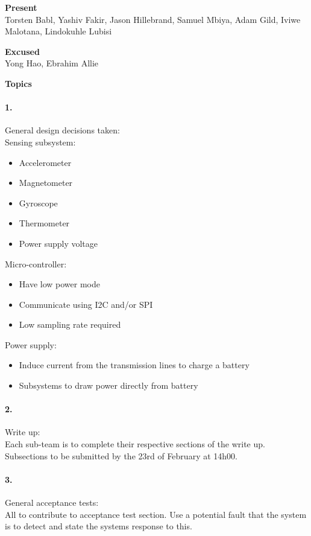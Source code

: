 \documentclass[12pt]{article}
\begin{document}
\textbf{Present}\\
Torsten Babl, Yashiv Fakir, Jason Hillebrand, Samuel Mbiya, Adam Gild, Iviwe Malotana, Lindokuhle Lubisi

\textbf{Excused}\\
Yong Hao, Ebrahim Allie

\textbf{Topics}
\paragraph[short]{1.} General design decisions taken:\\
Sensing subsystem:
\begin{itemize}
  \item Accelerometer
  \item Magnetometer
  \item Gyroscope
  \item Thermometer
  \item Power supply voltage
\end{itemize}

Micro-controller:
\begin{itemize}
  \item Have low power mode
  \item Communicate using I2C and/or SPI
  \item Low sampling rate required
\end{itemize}

Power supply:
\begin{itemize}
  \item Induce current from the transmission lines to charge a battery
  \item Subsystems to draw power directly from battery
\end{itemize}

\paragraph[short]{2.} Write up:\\
Each sub-team is to complete their respective sections of the write up.
Subsections to be submitted by the 23rd of February at 14h00.

\paragraph[short]{3.} General acceptance tests:\\
All to contribute to acceptance test section. Use a potential fault that the system is to detect and state the
systems response to this.

%
%
\end{document}
